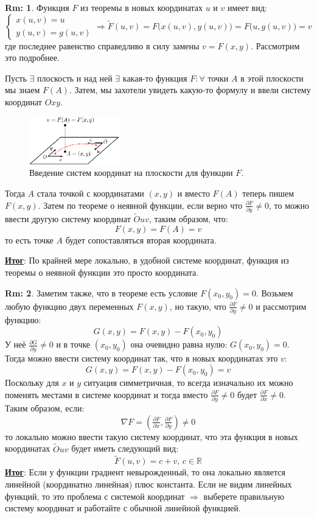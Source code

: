 \documentclass[12pt]{article}
\newcommand{\MR}{\mathbb{R}}
\theoremstyle{definition}
\newtheorem{rem}{Rm:}
\begin{document}
\begin{rem}
	Функция $F$ из теоремы в новых координатах $u$ и $v$ имеет вид: 
	$$
		\left\{\begin{array}{l}
			x(u,v) = u \\
			y(u,v) = g(u,v)
		\end{array}\right.
		\Rightarrow \widetilde{F}(u,v) = F\big(x(u,v),y(u,v)\big) = F\big(u, g(u,v) \big) = v
	$$ 
	где последнее равенство справедливо в силу замены $v = F(x,y)$. Рассмотрим это  подробнее.
	
	Пусть $\exists$ плоскость и над ней $\exists$ какая-то функция $F \colon \forall$ точки $A$ в этой плоскости мы знаем $F(A)$. Затем, мы захотели увидеть какую-то формулу и ввели систему координат $Oxy$.
	\begin{figure}[H]
		\centering
		\includegraphics[width=0.35\textwidth]{16_7.eps}
		\caption{Введение систем координат на плоскости для функции $F$.}
		\label{16_7}
	\end{figure}
	Тогда $A$ стала точкой с координатами $(x,y)$ и вместо $F(A)$ теперь пишем $F(x,y)$. Затем по теореме о неявной функции, если верно что $\tfrac{\partial F}{\partial y} \neq 0$, то можно ввести другую систему координат $\widetilde{O} uv$, таким образом, что: 
	$$
		 F(x,y) = F(A) = v
	$$
	то есть точке $A$ будет сопоставляться вторая координата.
	
	\textbf{\uline{Итог}}: По крайней мере локально, в удобной системе координат, функция из теоремы о неявной функции это просто координата.
\end{rem}
\begin{rem}
	Заметим также, что в теореме есть условие $F(x_0,y_0) = 0$. Возьмем любую функцию двух переменных $F(x,y)$, но такую, что $\tfrac{\partial F}{\partial y} \neq 0$ и рассмотрим функцию:
	$$
		G(x,y) = F(x,y) - F(x_0,y_0)
	$$
	У неё $\tfrac{\partial G}{\partial y} \neq 0$ и в точке $(x_0,y_0)$ она очевидно равна нулю: $G(x_0,y_0) = 0$. Тогда можно ввести систему координат так, что в новых координатах это $v$:
	$$
		G(x,y) = F(x,y) - F(x_0,y_0) = v
	$$
	Поскольку для $x$ и $y$ ситуация симметричная, то всегда изначально их можно поменять местами в системе координат и тогда вместо  $\tfrac{\partial F}{\partial y} \neq 0$ будет $\tfrac{\partial F}{\partial x} \neq 0$. Таким образом, если:
	$$
		\nabla F = (\tfrac{\partial F}{\partial x}, \tfrac{\partial F}{\partial y}) \neq 0
	$$ 
	то локально можно ввести такую систему координат, что эта функция в новых координатах $\widetilde{O} uv$ будет иметь следующий вид:
	$$
		\widetilde{F}(u,v) = c + v, \, c \in \MR
	$$
	\textbf{\uline{Итог}}: Если у функции градиент невырожденный, то она локально является линейной (координатно линейная) плюс константа. Если не видим линейных функций, то это проблема с системой координат $\Rightarrow$ выберете правильную систему координат и работайте с обычной линейной функцией.
\end{rem}
\end{document}
